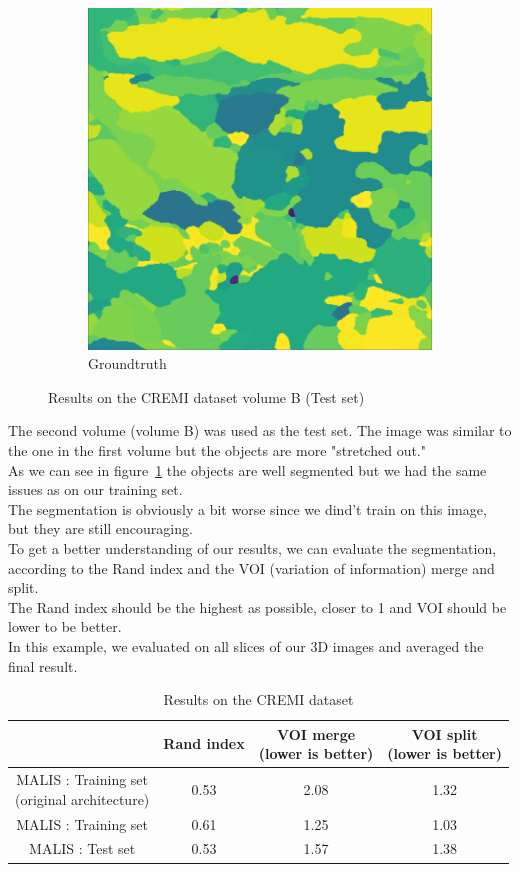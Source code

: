 \begin{figure}[!htbp]
\begin{subfigure}[t]{0.31\textwidth}
        \includegraphics[height=0.7\textwidth]{./images/cremi_gt_2.png}
        \caption{Groundtruth}
    \end{subfigure}
	\caption{Results on the CREMI dataset volume B (Test set)}
	\label{fig:cremi_results_b}
\end{figure}

The second volume (volume B) was used as the test set.
The image was similar to the one in the first volume but the objects are more
"stretched out."\\
As we can see in figure~\ref{fig:cremi_results_b} the objects are well
segmented but we had the same issues as on our training set.\\
The segmentation is obviously a bit worse since we dind't train on this image,
but they are still encouraging.\\

To get a better understanding of our results, we can evaluate the segmentation, 
according to the Rand index and the VOI (variation of information) merge and split.\\ 
The Rand index should be the highest as possible, closer to 1 and VOI should be lower to be better.\\
In this example, we evaluated on all slices of our 3D images and averaged the
final result.\\

\begin{table}[!htbp]
	\centering
	\begin{tabular}{|c|c|c|c|}
		\hline
		& Rand index & \thead{VOI merge \\(lower is better)} & \thead{VOI split\\(lower is better)} \\
		\hline
		\makecell{MALIS : Training set \\(original architecture)} & 0.53 & 2.08 & 1.32\\
		\hline
		MALIS : Training set & 0.61 & 1.25 & 1.03\\
		\hline
		MALIS : Test set & 0.53 & 1.57 & 1.38\\
		\hline
	\end{tabular}
	\caption{Results on the CREMI dataset}
\label{tab:cremi_res}
\end{table}

